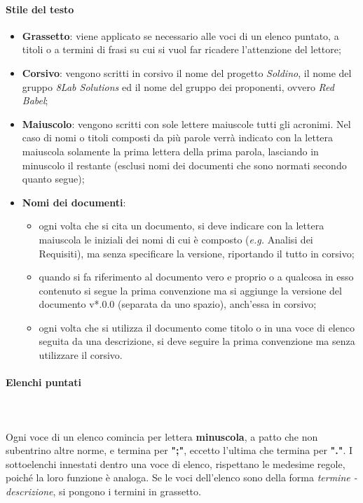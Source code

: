 		\paragraph{Stile del testo}
		\begin{itemize}
			\item \textbf{Grassetto}:
			viene applicato se necessario alle voci di un elenco puntato, a titoli o a termini di frasi su cui si vuol far ricadere l'attenzione del lettore;
			\item \textbf{Corsivo}: vengono scritti in corsivo il nome del progetto \textit{Soldino}, il nome del gruppo \textit{8Lab Solutions} ed il nome del gruppo dei proponenti, ovvero \textit{Red Babel}; %
			\item \textbf{Maiuscolo}: vengono scritti con sole lettere maiuscole tutti gli acronimi. Nel caso di nomi o titoli composti da più parole verrà indicato con la lettera maiuscola solamente la prima lettera della prima parola, lasciando in minuscolo il restante (esclusi nomi dei documenti che sono normati secondo quanto segue);
			\item \textbf{Nomi dei documenti}:
			\begin{itemize}
				\item ogni volta che si cita un documento, si deve indicare con la lettera maiuscola le iniziali dei nomi di cui è composto (\textit{e.g.} Analisi dei Requisiti), ma senza specificare la versione, riportando il tutto in corsivo;
				\item quando si fa riferimento al documento vero e proprio o a qualcosa in esso contenuto si segue la prima convenzione ma si aggiunge la versione del documento v*.0.0 (separata da uno spazio), anch'essa in corsivo;
				\item ogni volta che si utilizza il documento come titolo o in una voce di elenco seguita da una descrizione, si deve seguire la prima convenzione ma senza utilizzare il corsivo.
			\end{itemize}
		\end{itemize}
		\paragraph{Elenchi puntati} \mbox{}\\ \mbox{}\\
		Ogni voce di un elenco comincia per lettera \textbf{minuscola}, a patto che non subentrino altre norme, e termina per \textbf{";"}, eccetto l'ultima che termina per \textbf{"."}. I sottoelenchi innestati dentro una voce di elenco, rispettano le medesime regole, poiché la loro funzione è analoga.\newline
		Se le voci dell'elenco sono della forma \textit{termine - descrizione}, si pongono i termini in grassetto.
